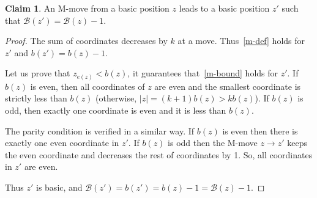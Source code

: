 \documentclass{article}
\theoremstyle{definition}
\newtheorem{claim}{Claim}
\def\B{\mathcal{B}}
\begin{document}
\begin{claim}\label{M-moveFromCritical}
  An M-move from a basic position $z$ leads to a basic position $z'$ such that  $\B(z')=\B(z)-1$.
\end{claim}
\begin{proof}
The sum of coordinates decreases by $k$ at a move. Thus~\eqref{m-def} holds for $z'$ and $b(z') = b(z)-1$. 
  
  Let us prove that $z_{e(z)}<b(z)$, it guarantees that~\eqref{m-bound} holds for $z'$. If $b(z)$ is even, then  all coordinates of $z$ are even and the smallest coordinate is strictly less than $b(z)$ \big(otherwise,  $|z| = (k+1)b(z)> kb(z)$\big).
  If $b(z)$ is odd, then exactly one coordinate is even and it is less than $b(z)$.

  The parity condition is verified in a similar way. 
  If $b(z)$ is even then  there is exactly one even coordinate in $z'$.
  If $b(z)$ is odd then the M-move  $z\to z'$ keeps the even coordinate and decreases the rest of coordinates by 1. So, all coordinates in $z'$  are even.
  
  Thus $z'$ is basic,  and $\B(z')=b(z')  =b(z)-1= \B(z)-1$.
\end{proof}
\end{document}

